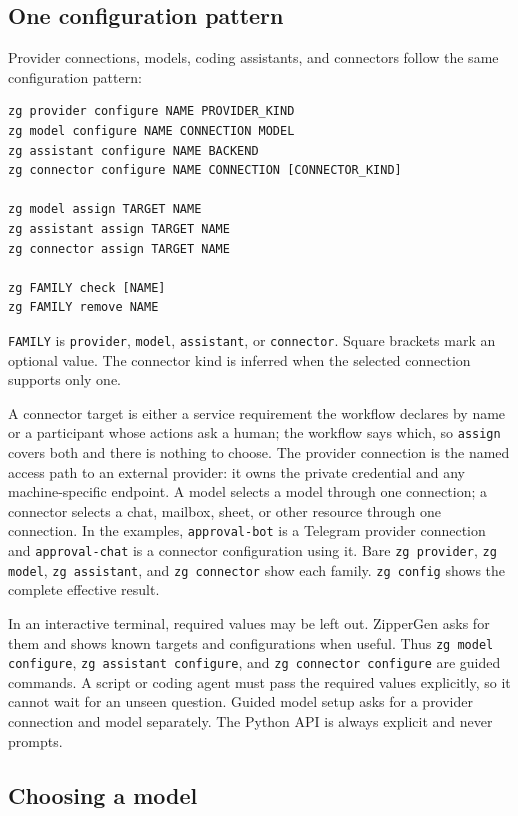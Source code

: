 \documentclass[11pt,a4paper]{article}
\begin{document}
\subsection{One configuration pattern}

Provider connections, models, coding assistants, and connectors follow the
same configuration pattern:

\begin{lstlisting}[style=shell]
zg provider configure NAME PROVIDER_KIND
zg model configure NAME CONNECTION MODEL
zg assistant configure NAME BACKEND
zg connector configure NAME CONNECTION [CONNECTOR_KIND]

zg model assign TARGET NAME
zg assistant assign TARGET NAME
zg connector assign TARGET NAME

zg FAMILY check [NAME]
zg FAMILY remove NAME
\end{lstlisting}

\texttt{FAMILY} is \texttt{provider}, \texttt{model}, \texttt{assistant}, or
\texttt{connector}. Square brackets mark an optional value. The connector kind
is inferred when the selected connection supports only one.

A connector target is either a service requirement the workflow declares by
name or a participant whose actions ask a human; the workflow says which, so
\texttt{assign} covers both and there is nothing to choose. The
provider connection is the named access path to an external provider: it owns
the private credential and any machine-specific endpoint. A model selects a
model through one connection; a connector selects a chat, mailbox, sheet, or
other resource through one connection. In the examples,
\texttt{approval-bot} is a Telegram provider connection and
\texttt{approval-chat} is a connector configuration using it. Bare
\texttt{zg provider}, \texttt{zg model}, \texttt{zg assistant}, and
\texttt{zg connector} show each family. \texttt{zg config} shows the complete
effective result.

In an interactive terminal, required values may be left out. ZipperGen asks
for them and shows known targets and configurations when useful. Thus
\texttt{zg model configure}, \texttt{zg assistant configure}, and
\texttt{zg connector configure} are guided commands. A script or coding agent
must pass the required values explicitly, so it cannot wait for an unseen
question. Guided model setup asks for a provider connection and model
separately. The Python API is always explicit and never prompts.

\subsection{Choosing a model}
\end{document}
